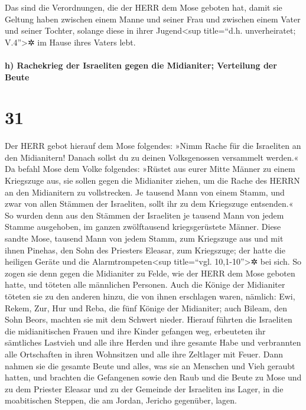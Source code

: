 Das sind die Verordnungen, die der HERR dem Mose geboten
hat, damit sie Geltung haben zwischen einem Manne und seiner Frau und
zwischen einem Vater und seiner Tochter, solange diese in ihrer
Jugend\textless sup title=``d.h. unverheiratet; V.4''\textgreater✲ im
Hause ihres Vaters lebt.

\hypertarget{h-rachekrieg-der-israeliten-gegen-die-midianiter-verteilung-der-beute}{%
\paragraph{h) Rachekrieg der Israeliten gegen die Midianiter; Verteilung
der
Beute}\label{h-rachekrieg-der-israeliten-gegen-die-midianiter-verteilung-der-beute}}

\hypertarget{section-30}{%
\section{31}\label{section-30}}

Der HERR gebot hierauf dem Mose folgendes:
»Nimm Rache für die Israeliten an den Midianitern! Danach
sollst du zu deinen Volksgenossen versammelt werden.« Da
befahl Mose dem Volke folgendes: »Rüstet aus eurer Mitte Männer zu einem
Kriegszuge aus, sie sollen gegen die Midianiter ziehen, um die Rache des
HERRN an den Midianitern zu vollstrecken. Je tausend Mann
von einem Stamm, und zwar von allen Stämmen der Israeliten, sollt ihr zu
dem Kriegszuge entsenden.« So wurden denn aus den Stämmen
der Israeliten je tausend Mann von jedem Stamme ausgehoben, im ganzen
zwölftausend kriegsgerüstete Männer. Diese sandte Mose,
tausend Mann von jedem Stamm, zum Kriegszuge aus und mit ihnen Pinehas,
den Sohn des Priesters Eleasar, zum Kriegszuge; der hatte die heiligen
Geräte und die Alarmtrompeten\textless sup title=``vgl.
10,1-10''\textgreater✲ bei sich. So zogen sie denn gegen
die Midianiter zu Felde, wie der HERR dem Mose geboten hatte, und
töteten alle männlichen Personen. Auch die Könige der
Midianiter töteten sie zu den anderen hinzu, die von ihnen erschlagen
waren, nämlich: Ewi, Rekem, Zur, Hur und Reba, die fünf Könige der
Midianiter; auch Bileam, den Sohn Beors, machten sie mit dem Schwert
nieder. Hierauf führten die Israeliten die midianitischen
Frauen und ihre Kinder gefangen weg, erbeuteten ihr sämtliches Lastvieh
und alle ihre Herden und ihre gesamte Habe und
verbrannten alle Ortschaften in ihren Wohnsitzen und alle ihre Zeltlager
mit Feuer. Dann nahmen sie die gesamte Beute und alles,
was sie an Menschen und Vieh geraubt hatten, und brachten
die Gefangenen sowie den Raub und die Beute zu Mose und zu dem Priester
Eleasar und zu der Gemeinde der Israeliten ins Lager, in die
moabitischen Steppen, die am Jordan, Jericho gegenüber, lagen.

